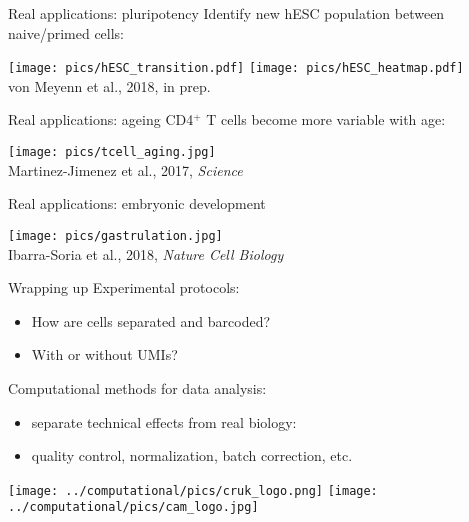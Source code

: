\documentclass{beamer}
\begin{document}
\begin{frame}{Real applications: pluripotency}
Identify new hESC population between naive/primed cells:
\begin{center}
\texttt{[image: pics/hESC\_transition.pdf]}
\texttt{[image: pics/hESC\_heatmap.pdf]}\\
{\tiny von Meyenn et al., 2018, in prep.}
\end{center}
\end{frame}

\begin{frame}{Real applications: ageing}
CD4$^+$ T cells become more variable with age: 
\begin{center}
\texttt{[image: pics/tcell\_aging.jpg]} \\
{\tiny Martinez-Jimenez et al., 2017, \textit{Science}}
\end{center}
\end{frame}

\begin{frame}{Real applications: embryonic development}
\begin{center}
\texttt{[image: pics/gastrulation.jpg]} \\
{\tiny Ibarra-Soria et al., 2018, \textit{Nature Cell Biology}}
\end{center}
\end{frame}

\begin{frame}{Wrapping up}
Experimental protocols:
\begin{itemize}
\item How are cells separated and barcoded?
\item With or without UMIs?
\end{itemize}

Computational methods for data analysis:
\begin{itemize}
\item separate technical effects from real biology:
\item quality control, normalization, batch correction, etc.
\end{itemize}
\vspace{0.1in}
\begin{center}
\texttt{[image: ../computational/pics/cruk\_logo.png]} \hspace{0.1in}
\texttt{[image: ../computational/pics/cam\_logo.jpg]} 
\end{center}
\end{frame}
\end{document}
